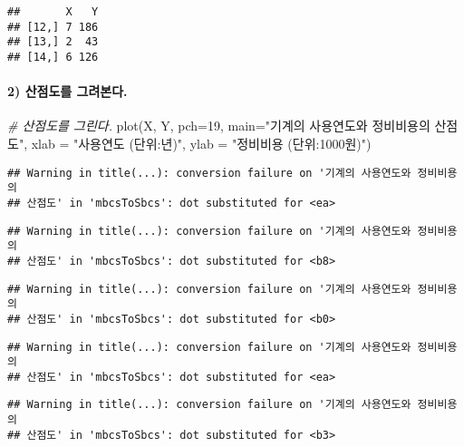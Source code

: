\documentclass[
]{article}
\newenvironment{Shaded}{\begin{snugshade}}{\end{snugshade}}
\newcommand{\AttributeTok}[1]{\textcolor[rgb]{0.77,0.63,0.00}{#1}}
\newcommand{\CommentTok}[1]{\textcolor[rgb]{0.56,0.35,0.01}{\textit{#1}}}
\newcommand{\DecValTok}[1]{\textcolor[rgb]{0.00,0.00,0.81}{#1}}
\newcommand{\FunctionTok}[1]{\textcolor[rgb]{0.00,0.00,0.00}{#1}}
\newcommand{\NormalTok}[1]{#1}
\newcommand{\StringTok}[1]{\textcolor[rgb]{0.31,0.60,0.02}{#1}}
\begin{document}
\begin{verbatim}
##       X   Y
## [12,] 7 186
## [13,] 2  43
## [14,] 6 126
\end{verbatim}

\hypertarget{uxc0b0uxc810uxb3c4uxb97c-uxadf8uxb824uxbcf8uxb2e4.}{%
\paragraph{2) 산점도를
그려본다.}\label{uxc0b0uxc810uxb3c4uxb97c-uxadf8uxb824uxbcf8uxb2e4.}}

\begin{Shaded}
\begin{Highlighting}[]
\CommentTok{\# 산점도를 그린다.}
\FunctionTok{plot}\NormalTok{(X, Y, }\AttributeTok{pch=}\DecValTok{19}\NormalTok{, }\AttributeTok{main=}\StringTok{"기계의 사용연도와 정비비용의 산점도"}\NormalTok{, }
     \AttributeTok{xlab =} \StringTok{"사용연도 (단위:년)"}\NormalTok{, }\AttributeTok{ylab =} \StringTok{"정비비용 (단위:1000원)"}\NormalTok{)}
\end{Highlighting}
\end{Shaded}

\begin{verbatim}
## Warning in title(...): conversion failure on '기계의 사용연도와 정비비용의
## 산점도' in 'mbcsToSbcs': dot substituted for <ea>
\end{verbatim}

\begin{verbatim}
## Warning in title(...): conversion failure on '기계의 사용연도와 정비비용의
## 산점도' in 'mbcsToSbcs': dot substituted for <b8>
\end{verbatim}

\begin{verbatim}
## Warning in title(...): conversion failure on '기계의 사용연도와 정비비용의
## 산점도' in 'mbcsToSbcs': dot substituted for <b0>
\end{verbatim}

\begin{verbatim}
## Warning in title(...): conversion failure on '기계의 사용연도와 정비비용의
## 산점도' in 'mbcsToSbcs': dot substituted for <ea>
\end{verbatim}

\begin{verbatim}
## Warning in title(...): conversion failure on '기계의 사용연도와 정비비용의
## 산점도' in 'mbcsToSbcs': dot substituted for <b3>
\end{verbatim}
\end{document}
